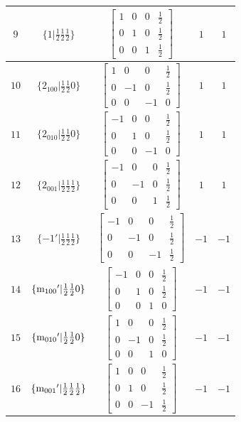 \documentclass[fleqn,8pt]{jsarticle}
\begin{document}
\begin{longtable}{ccccc}
$ 9 $ & $ \{1|\frac{1}{2} \frac{1}{2} \frac{1}{2}\} $ & $ \begin{bmatrix} 1 & 0 & 0 & \frac{1}{2} \\ 0 & 1 & 0 & \frac{1}{2} \\ 0 & 0 & 1 & \frac{1}{2} \end{bmatrix} $ & $ 1 $ & $ 1 $ \\ \hline
$ 10 $ & $ \{2{}_{100}|\frac{1}{2} \frac{1}{2} 0\} $ & $ \begin{bmatrix} 1 & 0 & 0 & \frac{1}{2} \\ 0 & -1 & 0 & \frac{1}{2} \\ 0 & 0 & -1 & 0 \end{bmatrix} $ & $ 1 $ & $ 1 $ \\ \hline
$ 11 $ & $ \{2{}_{010}|\frac{1}{2} \frac{1}{2} 0\} $ & $ \begin{bmatrix} -1 & 0 & 0 & \frac{1}{2} \\ 0 & 1 & 0 & \frac{1}{2} \\ 0 & 0 & -1 & 0 \end{bmatrix} $ & $ 1 $ & $ 1 $ \\ \hline
$ 12 $ & $ \{2{}_{001}|\frac{1}{2} \frac{1}{2} \frac{1}{2}\} $ & $ \begin{bmatrix} -1 & 0 & 0 & \frac{1}{2} \\ 0 & -1 & 0 & \frac{1}{2} \\ 0 & 0 & 1 & \frac{1}{2} \end{bmatrix} $ & $ 1 $ & $ 1 $ \\ \hline
$ 13 $ & $ \{-1{}'|\frac{1}{2} \frac{1}{2} \frac{1}{2}\} $ & $ \begin{bmatrix} -1 & 0 & 0 & \frac{1}{2} \\ 0 & -1 & 0 & \frac{1}{2} \\ 0 & 0 & -1 & \frac{1}{2} \end{bmatrix} $ & $ -1 $ & $ -1 $ \\ \hline
$ 14 $ & $ \{{\rm m}_{100}{}'|\frac{1}{2} \frac{1}{2} 0\} $ & $ \begin{bmatrix} -1 & 0 & 0 & \frac{1}{2} \\ 0 & 1 & 0 & \frac{1}{2} \\ 0 & 0 & 1 & 0 \end{bmatrix} $ & $ -1 $ & $ -1 $ \\ \hline
$ 15 $ & $ \{{\rm m}_{010}{}'|\frac{1}{2} \frac{1}{2} 0\} $ & $ \begin{bmatrix} 1 & 0 & 0 & \frac{1}{2} \\ 0 & -1 & 0 & \frac{1}{2} \\ 0 & 0 & 1 & 0 \end{bmatrix} $ & $ -1 $ & $ -1 $ \\ \hline
$ 16 $ & $ \{{\rm m}_{001}{}'|\frac{1}{2} \frac{1}{2} \frac{1}{2}\} $ & $ \begin{bmatrix} 1 & 0 & 0 & \frac{1}{2} \\ 0 & 1 & 0 & \frac{1}{2} \\ 0 & 0 & -1 & \frac{1}{2} \end{bmatrix} $ & $ -1 $ & $ -1 $ \\
\end{longtable}
\end{document}

